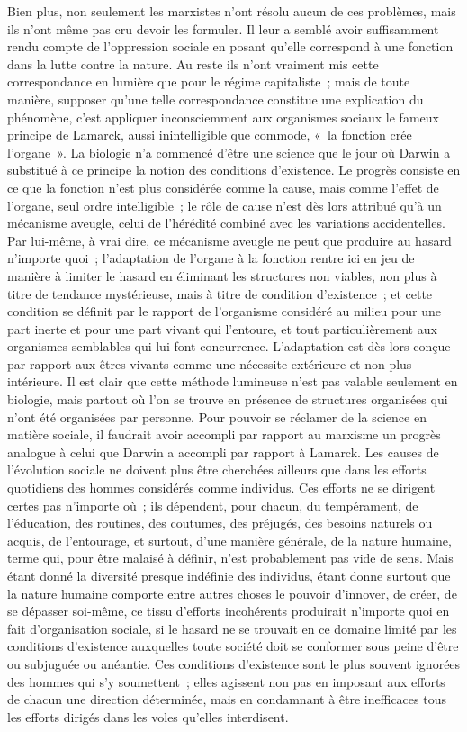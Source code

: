 \documentclass[french,twoside]{book} %
\begin{document}
Bien plus, non seulement les marxistes n'ont résolu aucun de ces problèmes, mais ils n'ont même pas cru devoir les formuler. Il leur a semblé avoir suffisamment rendu compte de l'oppression sociale en posant qu’elle correspond à une fonction dans la lutte contre la nature. Au reste ils n'ont vraiment mis cette correspondance en lumière que pour le régime capitaliste ; mais de toute manière, supposer qu'une telle correspondance constitue une explication du phénomène, c'est appliquer inconsciemment aux organismes sociaux le fameux principe de Lamarck, aussi inintelligible que commode, « la fonction crée l'organe ». La biologie n'a commencé d'être une science que le jour où Darwin a substitué à ce principe la notion des conditions d'existence. Le progrès consiste en ce que la fonction n'est plus considérée comme la cause, mais comme l'effet de l'organe, seul ordre intelligible ; le rôle de cause n'est dès lors attribué qu'à un mécanisme aveugle, celui de l'hérédité combiné avec les variations accidentelles. Par lui-même, à vrai dire, ce mécanisme aveugle ne peut que produire au hasard n'importe quoi ; l'adaptation de l'organe à la fonction rentre ici en jeu de manière à limiter le hasard en éliminant les structures non viables, non plus à titre de tendance mystérieuse, mais à titre de condition d'existence ; et cette condition se définit par le rapport de l'organisme considéré au milieu pour une part inerte et pour une part vivant qui l'entoure, et tout particulièrement aux organismes semblables qui lui font concurrence. L'adaptation est dès lors conçue par rapport aux êtres vivants comme une nécessite extérieure et non plus intérieure. Il est clair que cette méthode lumineuse n'est pas valable seulement en biologie, mais partout où l'on se trouve en présence de structures organisées qui n'ont été organisées par personne. Pour pouvoir se réclamer de la science en matière sociale, il faudrait avoir accompli par rapport au marxisme un progrès analogue à celui que Darwin a accompli par rapport à Lamarck. Les causes de l'évolution sociale ne doivent plus être cherchées ailleurs que dans les efforts quotidiens des hommes considérés comme individus. Ces efforts ne se dirigent certes pas n'importe où ; ils dépendent, pour chacun, du tempérament, de l'éducation, des routines, des coutumes, des préjugés, des besoins naturels ou acquis, de l'entourage, et surtout, d'une manière générale, de la nature humaine, terme qui, pour être malaisé à définir, n'est probablement pas vide de sens. Mais étant donné la diversité presque indéfinie des individus, étant donne surtout que la nature humaine comporte entre autres choses le pouvoir d'innover, de créer, de se dépasser soi-même, ce tissu d'efforts incohérents produirait n'importe quoi en fait d'organisation sociale, si le hasard ne se trouvait en ce domaine limité par les conditions d'existence auxquelles toute société doit se conformer sous peine d'être ou subjuguée ou anéantie. Ces conditions d'existence sont le plus souvent ignorées des hommes qui s'y soumettent ; elles agissent non pas en imposant aux efforts de chacun une direction déterminée, mais en condamnant à être inefficaces tous les efforts dirigés dans les voles qu'elles interdisent.\par
\end{document}
